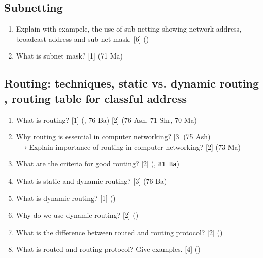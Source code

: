 \documentclass[12pt]{article}
\newcommand{\lb}{\\$\left|\rightarrow\right.$}
\begin{document}
	\subsection{Subnetting}
		\begin{enumerate}
			\item Explain with exampele, the use of sub-netting showing network address, broadcast address and sub-net mask. \hfill [6] ()

			\item What is subnet mask? \hfill [1] (71 Ma)
		\end{enumerate}

	\subsection{Routing: techniques, static vs. dynamic routing , routing table for classful address}
		\begin{enumerate}[noitemsep, topsep=0pt]
			\item What is routing? \hfill [1] (, 76 Ba) [2] (76 Ash, 71 Shr, 70 Ma)

			\item Why routing is essential in computer networking? \hfill [3] (75 Ash)
			\lb Explain importance of routing in computer networking? \hfill [2] (73 Ma)
			
			\item What are the criteria for good routing? \hfill [2] (, \texttt{81 Ba})

			\item What is static and dynamic routing? \hfill [3] (76 Ba)
			
			\item What is dynamic routing? \hfill [1] ()
			
			\item Why do we use dynamic routing? \hfill [2] ()

			\item What is the difference between routed and routing protocol? \hfill [2] ()
			
			\item What is routed and routing protocol? Give examples. \hfill [4] ()
		\end{enumerate}
\end{document}
